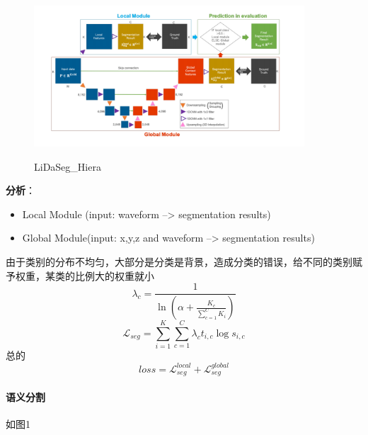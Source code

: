 \documentclass[a4paper,12pt]{article}
\begin{document}
	\begin{figure}[H]
	\begin{center}
		\includegraphics[width=0.9\textwidth]{img/LiDaSeg_Hiera.png} 
		\caption{LiDaSeg\_Hiera}
	\end{center}
\end{figure}

\textbf{分析}：
\begin{itemize}
	\item Local Module (input: waveform --> segmentation results)
	\item Global Module(input: x,y,z and waveform --> segmentation results)
\end{itemize}
由于类别的分布不均匀，大部分是分类是背景，造成分类的错误，给不同的类别赋予权重，某类的比例大的权重就小
$$\lambda_{c}=\frac{1}{\ln \left(\alpha+\frac{K_{c}}{\sum_{c=1}^{C} K_{i}}\right)}$$
$$\mathcal{L}_{s e g}=\sum_{i=1}^{K} \sum_{c=1}^{C} \lambda_{c} t_{i, c} \log s_{i, c}$$
总的$$loss = \mathcal{L}_{s e g}^{local} + \mathcal{L}_{s e g}^{global}$$

\paragraph{语义分割} 如图1
\end{document}
